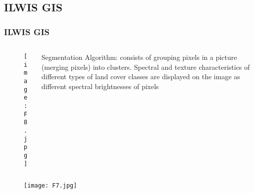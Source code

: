 \documentclass[pdflatex,compress,10pt,
	xcolor={dvipsnames,dvipsnames,svgnames,x11names,table},
	hyperref={
	breaklinks = true, 
	pdfauthor={Lemenkova Polina}, 
	pdfsubject={Preentation}, 
	pdfcreator={Lemenkova Polina}, 
	pdfproducer={Lemenkova Polina}, 
	citecolor=NavyBlue, 
	urlcolor = NavyBlue, 
	breaklinks = true}]{beamer}
\begin{document}
\subsection{ILWIS GIS}
\begin{frame}\frametitle{ILWIS GIS}

\begin{minipage}[0.4\textheight]{\textwidth}
\begin{columns}[T]
\begin{column}{0.5\textwidth}
\begin{figure}[H]
	\centering
		\texttt{[image: F8.jpg]}
\end{figure}
\end{column}
\begin{column}{0.5\textwidth}

\begin{alertblock}{Segmentation Algorithm:}
consists of grouping pixels in a picture (merging pixels) into clusters. Spectral and texture characteristics of different types of land cover classes are displayed on the image as different spectral brightnesses of pixels
\end{alertblock}

\end{column}
\end{columns}
\end{minipage}
\begin{figure}[H]
	\centering
		\texttt{[image: F7.jpg]}
\end{figure}
\end{frame}
\end{document}

